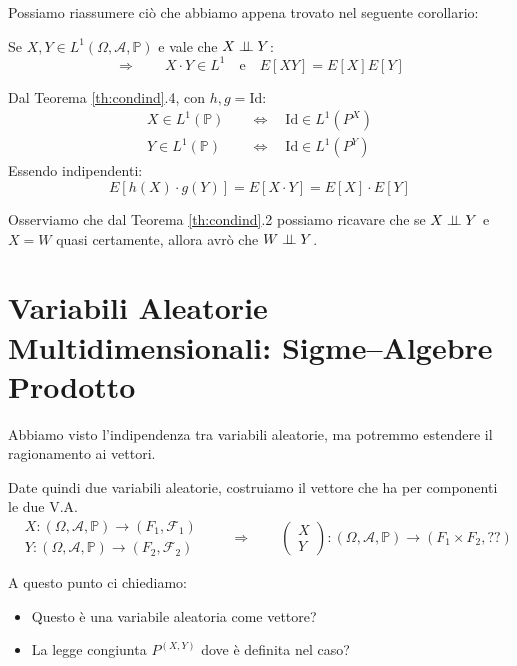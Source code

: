 \bigskip
\noindent Possiamo riassumere ciò che abbiamo appena trovato nel seguente corollario:
\begin{corollario}
    Se $X, Y\in L^1(\Omega, \mathcal{A}, \mathbb{P})$ e vale che $X\mathrel{\perp\!\!\!\perp} Y$:
    \[\Rightarrow\qquad X\cdot Y \in L^1 \quad \text{e}\quad E[XY] = E[X]E[Y]\]

    \begin{dimostrazione}
        Dal Teorema \ref{th:condind}.4, con $h, g = \text{Id}$:
        \begin{align*}
            X\in L^1(\mathbb{P})\quad &\iff \quad \text{Id} \in L^1(P^X)\\
            Y\in L^1(\mathbb{P})\quad &\iff \quad \text{Id} \in L^1(P^Y)
        \end{align*}
        Essendo indipendenti:
        \[E[h(X)\cdot g(Y)] = E[X\cdot Y] = E[X] \cdot E[Y]\]
    \end{dimostrazione}
\end{corollario}

Osserviamo che dal Teorema \ref{th:condind}.2 possiamo ricavare che se $X\mathrel{\perp\!\!\!\perp} Y$ e $X=W$ quasi certamente, allora avrò che $W \mathrel{\perp\!\!\!\perp} Y$.

\section{Variabili Aleatorie Multidimensionali: Sigme--Algebre Prodotto}
Abbiamo visto l'indipendenza tra variabili aleatorie, ma potremmo estendere il ragionamento ai vettori.

\medskip 
\noindent Date quindi due variabili aleatorie, costruiamo il vettore che ha per componenti le due V.A.
\[\begin{aligned}
    & X: (\Omega, \mathcal{A}, \mathbb{P})\to (F_1, \mathcal{F}_1)\\
    & Y: (\Omega, \mathcal{A}, \mathbb{P})\to (F_2, \mathcal{F}_2)
\end{aligned} \qquad\Longrightarrow\qquad
\begin{pmatrix} X\\Y \end{pmatrix} :(\Omega, \mathcal{A}, \mathbb{P})\to (F_1 \times F_2, ??)\]

\noindent A questo punto ci chiediamo:

\begin{itemize}
    \item Questo è una variabile aleatoria come vettore?
    \item La legge congiunta $P^{(X, Y)}$ dove è definita nel caso?
\end{itemize}


